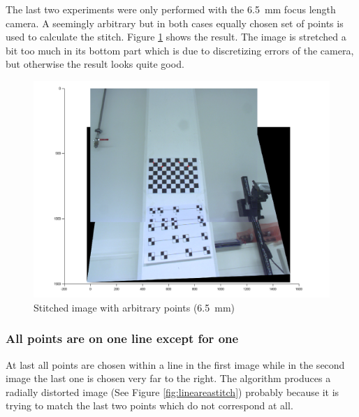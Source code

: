 \documentclass[
a4paper,     %
11pt         %
]{scrartcl}  %
\begin{document}
The last two experiments were only performed with the \SI{6.5}{mm} focus length camera.
A seemingly arbitrary but in both cases equally chosen set of points is used to calculate the stitch.
Figure \ref{fig:arbitraryareastitch} shows the result.
The image is stretched a bit too much in its bottom part which is due to discretizing errors of the camera, but otherwise the result looks quite good.

\begin{figure}[ht!]
 \centering
 \includegraphics[scale=0.4]{./Bildg_Messtechnik_Lab/PanoramaStitching/figb4.png}
 \caption{Stitched image with arbitrary points (\SI{6.5}{mm})}
 \label{fig:arbitraryareastitch}
\end{figure}

\subsubsection{All points are on one line except for one}

At last all points are chosen within a line in the first image while in the second image the last one is chosen very far to the right.
The algorithm produces a radially distorted image (See Figure  \ref{fig:lineareastitch}) probably because it is trying to match the last two points which do not correspond at all.
\end{document}

